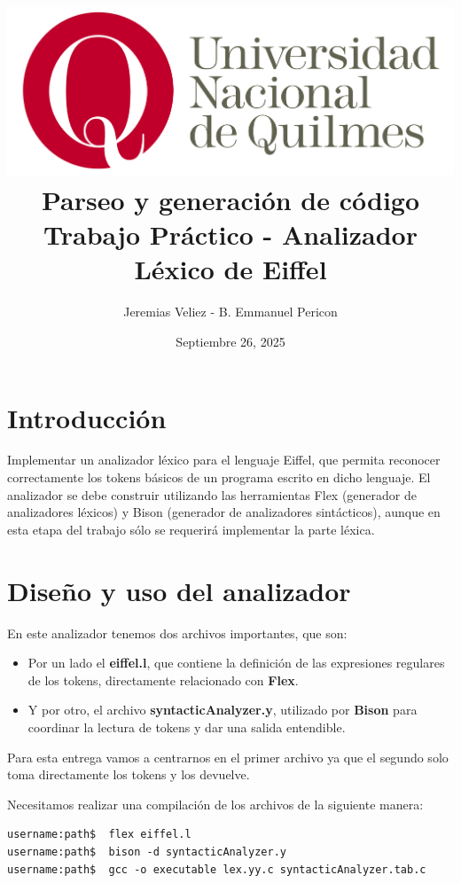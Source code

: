 \documentclass[a4paper,12pt]{article}
\title{
    \includegraphics[scale=1.3]{logo-UNQ}\\
    \vspace{4mm}
    \huge{Parseo y generación de código  \\
        \vspace{4mm}
        Trabajo Práctico - Analizador Léxico de Eiffel} }
\author{Jeremias Veliez - B. Emmanuel Pericon}
\date{Septiembre 26, 2025}
\begin{document}
\maketitle

\tableofcontents

\newpage

\section{Introducción}

\vspace{4mm}
Implementar un analizador léxico para el lenguaje Eiffel, que permita reconocer
correctamente los tokens básicos de un programa escrito en dicho lenguaje.
El analizador se debe construir utilizando las herramientas Flex (generador de
analizadores
léxicos) y Bison (generador de analizadores sintácticos), aunque en esta etapa
del trabajo
sólo se requerirá implementar la parte léxica.

\vspace{6mm}
\section{Diseño y uso del analizador}
\vspace{4mm}

En este analizador tenemos dos archivos importantes, que son:

\begin{itemize}
    \item Por un lado el \textbf{eiffel.l}, que contiene la definición de
          las
          expresiones regulares de los tokens, directamente relacionado con
          \textbf{Flex}.
    \item Y por otro, el archivo \textbf{syntacticAnalyzer.y}, utilizado
          por
          \textbf{Bison} para coordinar la lectura de tokens y dar una
          salida entendible.
\end{itemize}

\noindent
Para esta entrega vamos a centrarnos en el primer archivo ya que el segundo
solo toma directamente los tokens y los devuelve.

\vspace{4mm}
\noindent
Necesitamos realizar una compilación de los archivos de la siguiente manera:

\begin{lstlisting}[style=DOS]
username:path$  flex eiffel.l
username:path$  bison -d syntacticAnalyzer.y
username:path$  gcc -o executable lex.yy.c syntacticAnalyzer.tab.c
\end{lstlisting}
\end{document}
